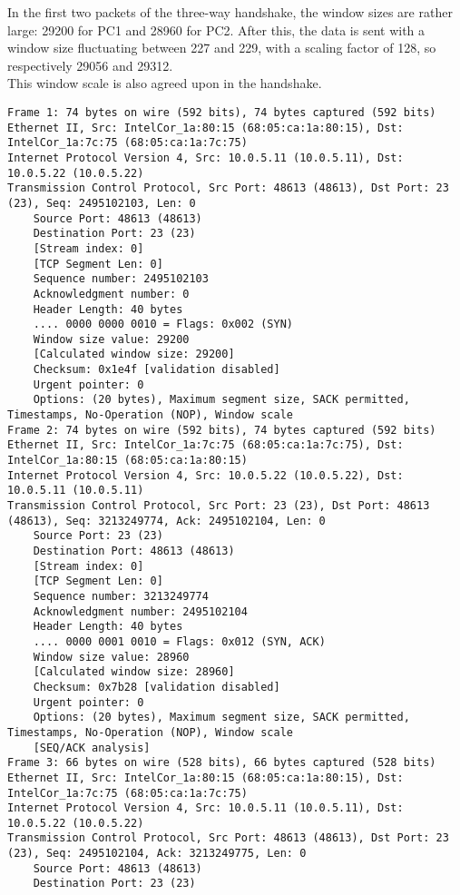 In the first two packets of the three-way handshake, the window sizes are rather large: 29200 for PC1 and 28960 for PC2. After this, the data is sent with a window size fluctuating between 227 and 229, with a scaling factor of 128, so respectively 29056 and 29312. \\
This window scale is also agreed upon in the handshake.

\begin{lstlisting}
Frame 1: 74 bytes on wire (592 bits), 74 bytes captured (592 bits)
Ethernet II, Src: IntelCor_1a:80:15 (68:05:ca:1a:80:15), Dst: IntelCor_1a:7c:75 (68:05:ca:1a:7c:75)
Internet Protocol Version 4, Src: 10.0.5.11 (10.0.5.11), Dst: 10.0.5.22 (10.0.5.22)
Transmission Control Protocol, Src Port: 48613 (48613), Dst Port: 23 (23), Seq: 2495102103, Len: 0
    Source Port: 48613 (48613)
    Destination Port: 23 (23)
    [Stream index: 0]
    [TCP Segment Len: 0]
    Sequence number: 2495102103
    Acknowledgment number: 0
    Header Length: 40 bytes
    .... 0000 0000 0010 = Flags: 0x002 (SYN)
    Window size value: 29200
    [Calculated window size: 29200]
    Checksum: 0x1e4f [validation disabled]
    Urgent pointer: 0
    Options: (20 bytes), Maximum segment size, SACK permitted, Timestamps, No-Operation (NOP), Window scale
Frame 2: 74 bytes on wire (592 bits), 74 bytes captured (592 bits)
Ethernet II, Src: IntelCor_1a:7c:75 (68:05:ca:1a:7c:75), Dst: IntelCor_1a:80:15 (68:05:ca:1a:80:15)
Internet Protocol Version 4, Src: 10.0.5.22 (10.0.5.22), Dst: 10.0.5.11 (10.0.5.11)
Transmission Control Protocol, Src Port: 23 (23), Dst Port: 48613 (48613), Seq: 3213249774, Ack: 2495102104, Len: 0
    Source Port: 23 (23)
    Destination Port: 48613 (48613)
    [Stream index: 0]
    [TCP Segment Len: 0]
    Sequence number: 3213249774
    Acknowledgment number: 2495102104
    Header Length: 40 bytes
    .... 0000 0001 0010 = Flags: 0x012 (SYN, ACK)
    Window size value: 28960
    [Calculated window size: 28960]
    Checksum: 0x7b28 [validation disabled]
    Urgent pointer: 0
    Options: (20 bytes), Maximum segment size, SACK permitted, Timestamps, No-Operation (NOP), Window scale
    [SEQ/ACK analysis]
Frame 3: 66 bytes on wire (528 bits), 66 bytes captured (528 bits)
Ethernet II, Src: IntelCor_1a:80:15 (68:05:ca:1a:80:15), Dst: IntelCor_1a:7c:75 (68:05:ca:1a:7c:75)
Internet Protocol Version 4, Src: 10.0.5.11 (10.0.5.11), Dst: 10.0.5.22 (10.0.5.22)
Transmission Control Protocol, Src Port: 48613 (48613), Dst Port: 23 (23), Seq: 2495102104, Ack: 3213249775, Len: 0
    Source Port: 48613 (48613)
    Destination Port: 23 (23)

\end{lstlisting}
